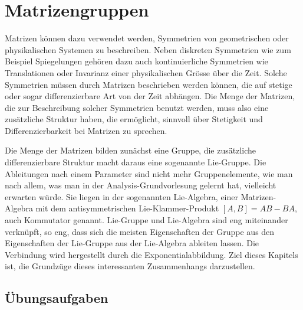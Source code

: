 %
%
%
\chapter{Matrizengruppen
\label{buch:chapter:matrizengruppen}}
\rhead{}
Matrizen können dazu verwendet werden, Symmetrien von geometrischen oder
physikalischen Systemen zu beschreiben.
%
%
Neben diskreten Symmetrien wie zum Beispiel Spiegelungen gehören dazu
%
%
%
auch kontinuierliche Symmetrien wie Translationen oder Invarianz einer
%
%
%
physikalischen Grösse über die Zeit.
Solche Symmetrien müssen durch Matrizen beschrieben werden können,
die auf stetige oder sogar differenzierbare Art von der Zeit abhängen.
Die Menge der Matrizen, die zur Beschreibung solcher Symmetrien benutzt
werden, muss also eine zusätzliche Struktur haben, die ermöglicht, 
sinnvoll über Stetigkeit und Differenzierbarkeit bei Matrizen
%
%
zu sprechen.

Die Menge der Matrizen bilden zunächst eine Gruppe,
die zusätzliche differenzierbare Struktur macht daraus
eine sogenannte Lie-Gruppe.
%
Die Ableitungen nach einem Parameter sind nicht mehr Gruppenelemente,
wie man nach allem, was man in der Analysis-Grundvorlesung
gelernt hat, vielleicht erwarten würde.
Sie liegen in der sogenannten Lie-Algebra,
einer Matrizen-Algebra mit dem antisymmetrischen
%
%
Lie-Klammer-Produkt $[A,B]=AB-BA$, auch Kommutator genannt.
%
%
Lie-Gruppe und Lie-Algebra sind eng miteinander verknüpft,
so eng, dass sich die meisten Eigenschaften der Gruppe aus den Eigenschaften
der Lie-Gruppe aus der Lie-Algebra ableiten lassen.
Die Verbindung wird hergestellt durch die Exponentialabbildung.
Ziel dieses Kapitels ist, die Grundzüge dieses interessanten 
Zusammenhangs darzustellen.




%

\section*{Übungsaufgaben}
\begin{uebungsaufgaben}
\end{uebungsaufgaben}

